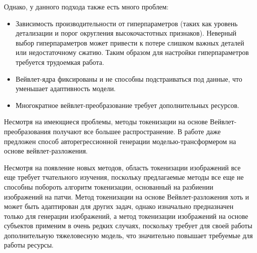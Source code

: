 \documentclass[times,specification,annotation]{itmo-student-thesis}
\begin{document}
Однако, у данного подхода также есть много проблем:

\begin{itemize}
    \item Зависимость производительности от гиперпараметров (таких как уровень детализации и порог округления высокочастотных признаков). Неверный выбор гиперпараметров может привести к потере слишком важных деталей или недостаточному сжатию. Таким образом для настройки гиперпараметров требуется трудоемкая работа.
    \item Вейвлет-ядра фиксированы и не способны подстраиваться под данные, что уменьшает адаптивность модели.
    \item Многократное вейвлет-преобразование требует дополнительных ресурсов.
\end{itemize}

Несмотря на имеющиеся проблемы, методы токенизации на основе Вейвлет-преобразования получают все большее распространение. В работе \cite{wavelet_autoregression} даже предложен способ авторегрессионной генерации моделью-трансформером на основе вейвлет-разложения. 

\s\chapterconclusion
Несмотря на появление новых методов, область токенизации изображений все еще требует тчательного изучения, поскольку предлагаемые методы все еще не способны побороть алгоритм токенизации, основанный на разбиении изображений на патчи. Метод токенизации на основе Вейвлет-разложения хоть и может быть адаптирован для других задач, однако изначально предназначен только для генерации изображений, а метод токенизации изображений на основе субъектов применим в очень редких случаях, поскольку требует для своей работы дополнительную тяжеловесную модель, что значительно повышает требуемые для работы ресурсы. 
\end{document}
